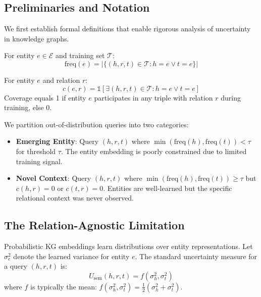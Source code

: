 
\subsection{Preliminaries and Notation}

We first establish formal definitions that enable rigorous analysis of uncertainty in knowledge graphs.

\begin{definition}
For entity $e \in \mathcal{E}$ and training set $\mathcal{T}$:
\begin{equation}
    \text{freq}(e) = |\{(h,r,t) \in \mathcal{T} : h=e \lor t=e\}|
\end{equation}
\end{definition}

\begin{definition}
For entity $e$ and relation $r$:
\begin{equation}
    c(e,r) = \mathbb{1}[\exists (h,r,t) \in \mathcal{T} : h=e \lor t=e]
\end{equation}
Coverage equals 1 if entity $e$ participates in any triple with relation $r$ during training, else 0.
\end{definition}

\begin{definition}
We partition out-of-distribution queries into two categories:
\begin{itemize}
    \item \textbf{Emerging Entity}: Query $(h,r,t)$ where $\min(\text{freq}(h), \text{freq}(t)) < \tau$ for threshold $\tau$. The entity embedding is poorly constrained due to limited training signal.
    \item \textbf{Novel Context}: Query $(h,r,t)$ where $\min(\text{freq}(h), \text{freq}(t)) \geq \tau$ but $c(h,r) = 0$ or $c(t,r) = 0$. Entities are well-learned but the specific relational context was never observed.
\end{itemize}
\end{definition}

\subsection{The Relation-Agnostic Limitation}

Probabilistic KG embeddings learn distributions over entity representations. Let $\sigma^2_e$ denote the learned variance for entity $e$. The standard uncertainty measure for a query $(h,r,t)$ is:
\begin{equation}
    U_{\text{sem}}(h,r,t) = f(\sigma^2_h, \sigma^2_t)
    \label{eq:semantic}
\end{equation}
where $f$ is typically the mean: $f(\sigma^2_h, \sigma^2_t) = \frac{1}{2}(\sigma^2_h + \sigma^2_t)$.

